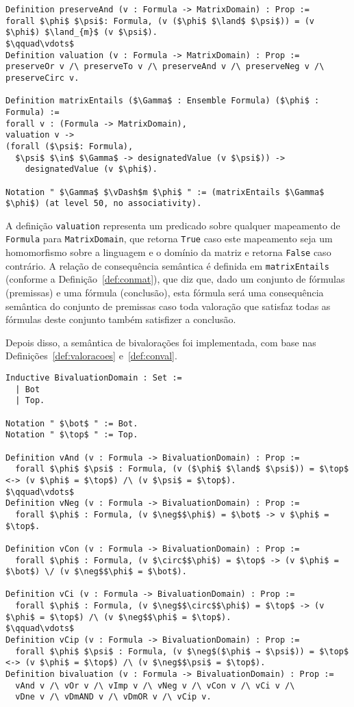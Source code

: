       \begin{lstlisting}[name=Semantics, frame=single, language=coq]
Definition preserveAnd (v : Formula -> MatrixDomain) : Prop := 
forall $\phi$ $\psi$: Formula, (v ($\phi$ $\land$ $\psi$)) = (v $\phi$) $\land_{m}$ (v $\psi$).
$\qquad\vdots$
Definition valuation (v : Formula -> MatrixDomain) : Prop :=
preserveOr v /\ preserveTo v /\ preserveAnd v /\ preserveNeg v /\ preserveCirc v.

Definition matrixEntails ($\Gamma$ : Ensemble Formula) ($\phi$ : Formula) := 
forall v : (Formula -> MatrixDomain),
valuation v -> 
(forall ($\psi$: Formula), 
  $\psi$ $\in$ $\Gamma$ -> designatedValue (v $\psi$)) -> 
    designatedValue (v $\phi$).

Notation " $\Gamma$ $\vDash$m $\phi$ " := (matrixEntails $\Gamma$ $\phi$) (at level 50, no associativity).
      \end{lstlisting}

      A definição \texttt{valuation} representa um predicado sobre qualquer mapeamento de \texttt{Formula} para \texttt{MatrixDomain}, que retorna \texttt{True} caso este mapeamento seja um homomorfismo sobre a linguagem e o domínio da matriz e retorna \texttt{False} caso contrário. A relação de consequência semântica é definida em \texttt{matrixEntails} (conforme a Definição~\ref{def:conmat}), que diz que, dado um conjunto de fórmulas (premissas) e uma fórmula (conclusão), esta fórmula será uma consequência semântica do conjunto de premissas caso toda valoração que satisfaz todas as fórmulas deste conjunto também satisfizer a conclusão.

      Depois disso, a semântica de bivalorações foi implementada, com base nas Definições~\ref{def:valoracoes} e~\ref{def:conval}.

      \begin{lstlisting}[name=Semantics, frame=single, language=coq]
Inductive BivaluationDomain : Set :=
  | Bot
  | Top.

Notation " $\bot$ " := Bot.
Notation " $\top$ " := Top.

Definition vAnd (v : Formula -> BivaluationDomain) : Prop :=
  forall $\phi$ $\psi$ : Formula, (v ($\phi$ $\land$ $\psi$)) = $\top$ <-> (v $\phi$ = $\top$) /\ (v $\psi$ = $\top$).
$\qquad\vdots$
Definition vNeg (v : Formula -> BivaluationDomain) : Prop :=
  forall $\phi$ : Formula, (v $\neg$$\phi$) = $\bot$ -> v $\phi$ = $\top$.

Definition vCon (v : Formula -> BivaluationDomain) : Prop :=
  forall $\phi$ : Formula, (v $\circ$$\phi$) = $\top$ -> (v $\phi$ = $\bot$) \/ (v $\neg$$\phi$ = $\bot$).

Definition vCi (v : Formula -> BivaluationDomain) : Prop :=
  forall $\phi$ : Formula, (v $\neg$$\circ$$\phi$) = $\top$ -> (v $\phi$ = $\top$) /\ (v $\neg$$\phi$ = $\top$).
$\qquad\vdots$
Definition vCip (v : Formula -> BivaluationDomain) : Prop :=
  forall $\phi$ $\psi$ : Formula, (v $\neg$($\phi$ → $\psi$)) = $\top$ <-> (v $\phi$ = $\top$) /\ (v $\neg$$\psi$ = $\top$).
Definition bivaluation (v : Formula -> BivaluationDomain) : Prop :=
  vAnd v /\ vOr v /\ vImp v /\ vNeg v /\ vCon v /\ vCi v /\
  vDne v /\ vDmAND v /\ vDmOR v /\ vCip v.
              \end{lstlisting}

